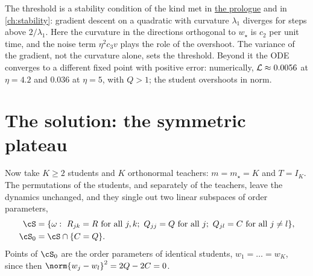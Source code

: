 \begin{refsection}
The threshold is a stability condition of the kind met in \hyperref[ch:prologue]{the prologue} and in \cref{ch:stability}: gradient descent on a quadratic with curvature $\lambda_1$ diverges for steps above $2/\lambda_1$. Here the curvature in the directions orthogonal to $w_\star$ is $c_2$ per unit time, and the noise term $\eta^2c_3v$ plays the role of the overshoot. The variance of the gradient, not the curvature alone, sets the threshold. Beyond it the ODE converges to a different fixed point with positive error: numerically, $\mathcal{L}\approx0.0056$ at $\eta=4.2$ and $0.036$ at $\eta=5$, with $Q>1$; the student overshoots in norm.

\section{The solution: the symmetric plateau}\label{sec:committee:plateau}

Now take $K\ge2$ students and $K$ orthonormal teachers: $m=m_\star=K$ and $T=I_K$. The permutations of the students, and separately of the teachers, leave the dynamics unchanged, and they single out two linear subspaces of order parameters,
\begin{align*}
  \cS&=\{\omega:\ R_{jk}=R\text{ for all }j,k;\ Q_{jj}=Q\text{ for all }j;\ Q_{jl}=C\text{ for all }j\ne l\},\\
  \cS_0&=\cS\cap\{C=Q\}.
\end{align*}
Points of $\cS_0$ are the order parameters of identical students, $w_1=\dots=w_K$, since then $\norm{w_j-w_l}^2=2Q-2C=0$.


\end{refsection}
